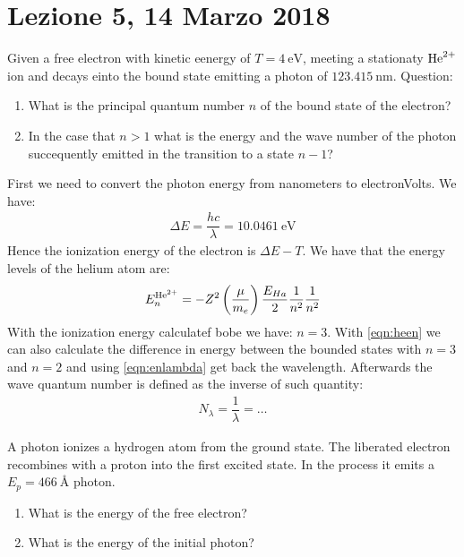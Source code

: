 \documentclass[../AppuntiStruttura.tex]{subfiles}
\begin{document}
\section{Lezione 5, 14 Marzo 2018}

	\begin{exe}
		Given a free electron with kinetic eenergy of $ T=\SI{4}{\electronvolt} $, meeting a stationaty $ \text{He}^{2+} $ ion and decays einto the bound state emitting a photon of $ \SI{123.415}{\nano\meter} $. 
		Question:
		\begin{enumerate}
			\item What is the principal quantum number $ n $ of the bound state of the electron? 
			\item In the case that $ n>1 $ what is the energy and the wave number of the photon succequently emitted in the transition to a state $ n-1 $?
		\end{enumerate}
	\end{exe}
	\begin{sol}
		First we need to convert the photon energy from nanometers to electronVolts. We have:
		\begin{gather}
			\label{eqn:enlambda}
			\Delta E = \dfrac{hc}{\lambda}=\SI{10.0461}{\electronvolt}
		\end{gather}
		Hence the ionization energy of the electron is $ \Delta E - T $. We have that the energy levels of the helium atom are:
		\begin{gather}
		\label{eqn:heen}
		E_{n}^{\text{He}^{2+}}=-Z^{2}\left(\dfrac{\mu}{m_{e}}\right)\dfrac{E_{Ha}}{2}\dfrac{1}{n^{2}}\dfrac{1}{n^{2}}
		\end{gather}
		With the ionization energy calculatef bobe we have: $ n=3 $. With \ref{eqn:heen} we can also calculate the difference in energy between the bounded states with $ n=3 $ and $ n=2 $ and using \ref{eqn:enlambda} get back the wavelength. Afterwards the wave quantum number is defined as the inverse of such quantity:
		\begin{gather*}
		N_\lambda=\dfrac{1}{\lambda}=\dots
		\end{gather*}
	\end{sol}
	\begin{exe}
		A photon ionizes a hydrogen atom from the ground state. The liberated electron recombines with a proton into the first excited state. In the process it emits a $ E_{p}=\SI{466}{\angstrom} $ photon.
		\begin{enumerate}
			\item What is the energy of the free electron?
			\item What is the energy of the initial photon?
		\end{enumerate}
	\end{exe}
\end{document}
